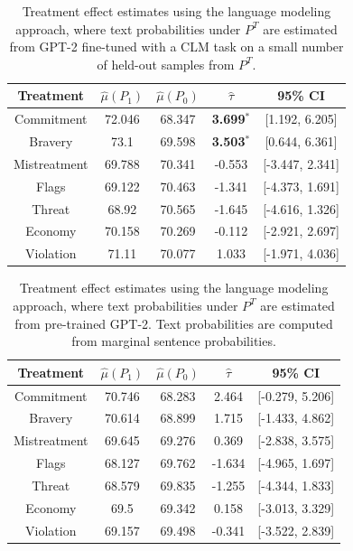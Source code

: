 \documentclass{article}
\begin{document}
\begin{table}[!ht]
    \centering
    \begin{tabular}{c|cccc}
        \toprule
        Treatment & $\hat{\mu}(P_1)$ & $\hat{\mu}(P_0)$ & $\hat{\tau}$ & 95\% CI \\
        \midrule
        Commitment & 72.046 & 68.347 & \textbf{\textcolor{green!50!black}{3.699$^*$}} & [1.192, 6.205] \\
        Bravery & 73.1 & 69.598 & \textbf{\textcolor{green!50!black}{3.503$^*$}} & [0.644, 6.361] \\
        Mistreatment & 69.788 & 70.341 & \textcolor{red!80!black}{-0.553} & [-3.447, 2.341] \\
        Flags & 69.122 & 70.463 & \textcolor{red!80!black}{-1.341} & [-4.373, 1.691] \\
        Threat & 68.92 & 70.565 & \textcolor{red!80!black}{-1.645} & [-4.616, 1.326] \\
        Economy & 70.158 & 70.269 & \textcolor{red!80!black}{-0.112} & [-2.921, 2.697] \\
        Violation & 71.11 & 70.077 & \textcolor{green!50!black}{1.033} & [-1.971, 4.036] \\
        \bottomrule
    \end{tabular}
    \caption{Treatment effect estimates using the language modeling approach, where text probabilities under $P^T$ are estimated from GPT-2 fine-tuned with a CLM task on a small number of held-out samples from $P^T$.}
    \label{tab:results_lm2}
\end{table}

\begin{table}[!ht]
    \centering
    \begin{tabular}{c|cccc}
        \toprule
        Treatment & $\hat{\mu}(P_1)$ & $\hat{\mu}(P_0)$ & $\hat{\tau}$ & 95\% CI \\
        \midrule
        Commitment & 70.746 & 68.283 & \textcolor{green!50!black}{2.464} & [-0.279, 5.206] \\
        Bravery & 70.614 & 68.899 & \textcolor{green!50!black}{1.715} & [-1.433, 4.862] \\
        Mistreatment & 69.645 & 69.276 & \textcolor{green!50!black}{0.369} & [-2.838, 3.575] \\
        Flags & 68.127 & 69.762 & \textcolor{red!80!black}{-1.634} & [-4.965, 1.697] \\
        Threat & 68.579 & 69.835 & \textcolor{red!80!black}{-1.255} & [-4.344, 1.833] \\
        Economy & 69.5 & 69.342 & \textcolor{green!50!black}{0.158} & [-3.013, 3.329]  \\
        Violation & 69.157 & 69.498 & \textcolor{red!80!black}{-0.341} & [-3.522, 2.839] \\
        \bottomrule
    \end{tabular}
    \caption{Treatment effect estimates using the language modeling approach, where text probabilities under $P^T$ are estimated from pre-trained GPT-2. Text probabilities are computed from marginal sentence probabilities.}
    \label{tab:results_lm3}
\end{table}
\end{document}
